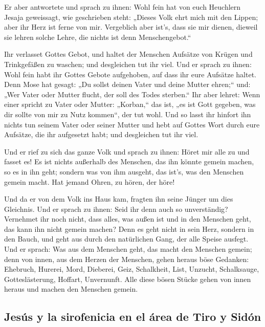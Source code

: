  Er aber antwortete und sprach zu ihnen: Wohl fein hat von
euch Heuchlern Jesaja geweissagt, wie geschrieben steht: „Dieses Volk
ehrt mich mit den Lippen; aber ihr Herz ist ferne von mir.
 Vergeblich aber ist's, dass sie mir dienen, dieweil sie
lehren solche Lehre, die nichts ist denn Menschengebot.``

 Ihr verlasset Gottes Gebot, und haltet der Menschen
Aufsätze von Krügen und Trinkgefäßen zu waschen; und desgleichen tut ihr
viel.  Und er sprach zu ihnen: Wohl fein habt ihr Gottes
Gebote aufgehoben, auf dass ihr eure Aufsätze haltet. 
Denn Mose hat gesagt: „Du sollst deinen Vater und deine Mutter ehren;``
und: „Wer Vater oder Mutter flucht, der soll des Todes sterben.``
 Ihr aber lehret: Wenn einer spricht zu Vater oder
Mutter: „Korban,`` das ist, „es ist Gott gegeben, was dir sollte von mir
zu Nutz kommen``, der tut wohl.  Und so lasst ihr hinfort
ihn nichts tun seinem Vater oder seiner Mutter  und hebt
auf Gottes Wort durch eure Aufsätze, die ihr aufgesetzt habt; und
desgleichen tut ihr viel.

 Und er rief zu sich das ganze Volk und sprach zu ihnen:
Höret mir alle zu und fasset es!  Es ist nichts außerhalb
des Menschen, das ihn könnte gemein machen, so es in ihn geht; sondern
was von ihm ausgeht, das ist's, was den Menschen gemein macht.
 Hat jemand Ohren, zu hören, der höre!

 Und da er von dem Volk ins Haus kam, fragten ihn seine
Jünger um dies Gleichnis.  Und er sprach zu ihnen: Seid
ihr denn auch so unverständig? Vernehmet ihr noch nicht, dass alles, was
außen ist und in den Menschen geht, das kann ihn nicht gemein machen?
 Denn es geht nicht in sein Herz, sondern in den Bauch,
und geht aus durch den natürlichen Gang, der alle Speise ausfegt.
 Und er sprach: Was aus dem Menschen geht, das macht den
Menschen gemein;  denn von innen, aus dem Herzen der
Menschen, gehen heraus böse Gedanken: Ehebruch, Hurerei, Mord,
 Dieberei, Geiz, Schalkheit, List, Unzucht, Schalksauge,
Gotteslästerung, Hoffart, Unvernunft.  Alle diese bösen
Stücke gehen von innen heraus und machen den Menschen gemein.

\hypertarget{jesuxfas-y-la-sirofenicia-en-el-uxe1rea-de-tiro-y-siduxf3n}{%
\subsection{Jesús y la sirofenicia en el área de Tiro y
Sidón}\label{jesuxfas-y-la-sirofenicia-en-el-uxe1rea-de-tiro-y-siduxf3n}}


